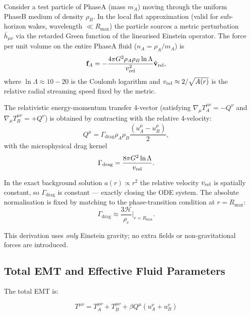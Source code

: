 \documentclass[10pt,twocolumn]{article}
\theoremstyle{definition}
\newcommand{\Rmax}{R_{\max}}
\newcommand{\rhoA}{\rho_{A}}
\newcommand{\rhoB}{\rho_{B}}
\newcommand{\Hcal}{\mathcal{H}}
\newcommand{\Gammadrag}{\Gamma_{\mathrm{drag}}}
\newcommand{\rhoc}{\rho_{c}}
\begin{document}
Consider a test particle of Phase\nobreakspace{}A (mass \(m_A\)) moving through the uniform Phase\nobreakspace{}B medium of density \(\rhoB\). In the local flat approximation (valid for sub-horizon wakes, wavelength \(\ll\Rmax\)) the particle sources a metric perturbation \(\bar{h}_{\mu\nu}\) via the retarded Green function of the linearised Einstein operator. The force per unit volume on the entire Phase\nobreakspace{}A fluid (\(n_A=\rhoA/m_A\)) is
\begin{equation}
  \mathbf{f}_A = -\frac{4\pi G^2\rhoA\rhoB\ln\Lambda}{v_{\rm rel}^2}\hat{\mathbf{v}}_{\rm rel},
\end{equation}
where \(\ln\Lambda\approx 10{-}20\) is the Coulomb logarithm and \(v_{\rm rel}\approx 2/\sqrt{A(r)}\) is the relative radial streaming speed fixed by the metric.

The relativistic energy-momentum transfer 4-vector (satisfying \(\nabla_\mu T_A^{\mu\nu}=-Q^\nu\) and \(\nabla_\mu T_B^{\mu\nu}=+Q^\nu\)) is obtained by contracting with the relative 4-velocity:
\begin{equation}
  Q^\mu = \Gammadrag\rhoA\rhoB\frac{(u_A^\mu-u_B^\mu)}{2},
  \label{eq:Q-micro}
\end{equation}
with the microphysical drag kernel
\begin{equation}
  \Gammadrag = \frac{8\pi G^2\ln\Lambda}{v_{\rm rel}}.
\end{equation}

In the exact background solution \(a(r)\propto r^2\) the relative velocity \(v_{\rm rel}\) is spatially constant, so \(\Gammadrag\) is constant — exactly closing the ODE system. The absolute normalisation is fixed by matching to the phase-transition condition at \(r=\Rmax\):
\begin{equation}
  \Gammadrag\approx\frac{3\Hcal}{\rhoc}\Big|_{r=\Rmax}.
\end{equation}

This derivation uses \emph{only} Einstein gravity; no extra fields or non-gravitational forces are introduced.





\subsection{Total EMT and Effective Fluid Parameters}

The total EMT is:

\begin{equation}
  T^{\mu\nu} = T_{A}^{\mu\nu} + T_{B}^{\mu\nu} + \beta Q^{\mu} (u_{A}^{\nu} + u_{B}^{\nu})
  \label{eq:total-emt}
\end{equation}%
\end{document}
